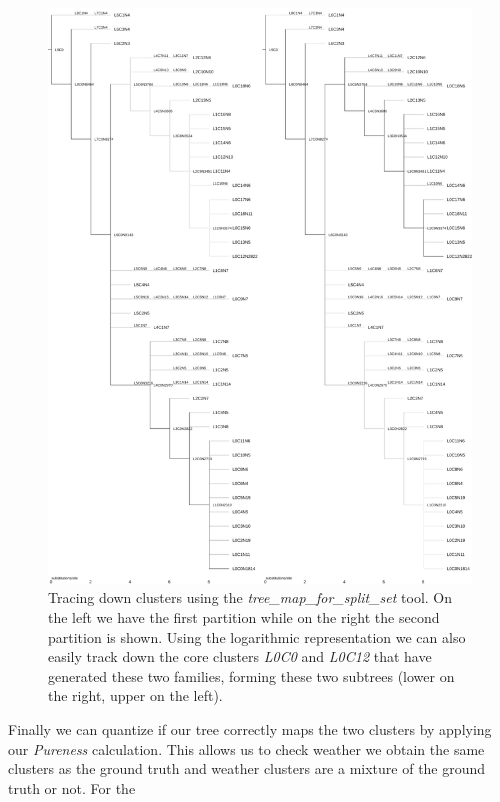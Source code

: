 \begin{figure}
  \begin{center}
    \includegraphics[scale=0.3]{tree-clust-tutorial.pdf}
    \caption{Tracing down clusters using the
      \emph{tree\_map\_for\_split\_set} tool. On the left we have the
      first partition while on the right the second partition is
      shown. Using the logarithmic representation we can also easily
      track down the core clusters \emph{L0C0} and \emph{L0C12} that
      have generated these two families, forming these two subtrees
      (lower on the right, upper on the left).}
    \label{fig-treemapss-tutorial}
  \end{center}
\end{figure}
Finally we can quantize if our tree correctly maps the two
clusters by applying our \emph{Pureness} calculation. This allows us
to check weather we obtain the same clusters as the ground truth and
weather clusters are a mixture of the ground truth or not. For the

